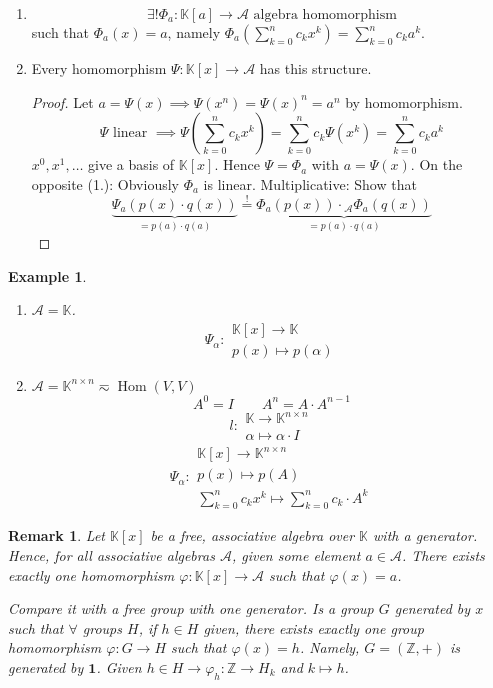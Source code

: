 \documentclass{article}
\newtheorem{example}{Example}  \numberwithin{example}{section}
\newtheorem{remark}{Remark}  \numberwithin{remark}{section}
\DeclareMathOperator{\Hom}{Hom}
\begin{document}
\begin{enumerate}
  \item 
    \[ \exists! \Phi_a: \mathbb K[a] \to \mathcal A \text{ algebra homomorphism} \]
    such that $\Phi_a(x) = a$, namely $\Phi_a\left(\sum_{k=0}^n c_k x^k\right) = \sum_{k=0}^n c_k a^k$.
  \item
    Every homomorphism $\Psi: \mathbb K[x] \to \mathcal A$ has this structure.
    \begin{proof}
      Let $a = \Psi(x) \implies \Psi(x^n) = \Psi(x)^n = a^n$ by homomorphism.
      \[ \Psi \text{ linear } \implies \Psi\left(\sum_{k=0}^n c_k x^k\right) = \sum_{k=0}^n c_k \Psi(x^k) = \sum_{k=0}^n c_k a^k \]
      $x^0, x^1, \dots$ give a basis of $\mathbb K[x]$.
      Hence $\Psi = \Phi_a$ with $a = \Psi(x)$. On the opposite (1.): Obviously $\Phi_a$ is linear.
      Multiplicative: Show that
      \[ \underbrace{\Psi_a(p(x) \cdot q(x))}_{= p(a) \cdot q(a)} \overset!= \underbrace{\Phi_a(p(x)) \cdot {}_{\mathcal A}\Phi_a(q(x))}_{= p(a) \cdot q(a)} \]
    \end{proof}
\end{enumerate}

\begin{example} %
  \begin{enumerate}
    \item $\mathcal A = \mathbb K$.
      \[ \Psi_\alpha: \substack{\mathbb K[x] \to \mathbb K \\ p(x) \mapsto p(\alpha)} \]
    \item $\mathcal A = \mathbb K^{n\times n} \eqsim \Hom(V, V)$
      \[ A^0 = I \qquad A^n = A \cdot A^{n-1} \]
      \[ l: \substack{\mathbb K \to \mathbb K^{n\times n} \\ \alpha \mapsto \alpha \cdot I} \]
      \[ \Psi_\alpha: \substack{\mathbb K[x] \to \mathbb K^{n\times n} \\ p(x) \mapsto p(A) \\ \sum_{k=0}^n c_k x^k \mapsto \sum_{k=0}^n c_k \cdot A^k}  \]
  \end{enumerate}
\end{example}

\begin{remark} %
  Let $\mathbb K[x]$ be a free, associative algebra over $\mathbb K$ with a generator.
  Hence, for all associative algebras $\mathcal A$, given some element $a \in \mathcal A$.
  There exists exactly one homomorphism $\varphi: \mathbb K[x] \to \mathcal A$ such that $\varphi(x) = a$.

  Compare it with a free group with one generator. Is a group $G$ generated by $x$ such that $\forall$ groups $H$, if $h \in H$ given,
  there exists exactly one group homomorphism $\varphi: G \to H$ such that $\varphi(x) = h$. Namely, $G = (\mathbb Z, +)$ is generated by $\mathbf 1$.
  Given $h \in H \to \varphi_h: \mathbb Z \to H_k$ and $k \mapsto h$.
\end{remark}
\end{document}
